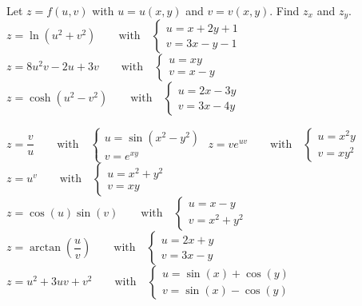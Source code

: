 \begin{Exercise} Let $z=f(u,v)$ with $u=u(x,y)$ and $v=v(x,y)$. Find $z_x$ and $z_y$.  %
	\Question[difficulty=1] $z = \ln \left(u^2+v^2\right)\qquad \mbox{with} \quad \left\{\begin{array}{l} u = x+2y+1\\ v = 3x-y-1\end{array}\right.$ 
	\ifcalculus
	\Question[difficulty=1] $z = 8u^2v-2u+3v \qquad \mbox{with} \quad \left\{\begin{array}{l} u = xy\\ v = x-y\end{array}\right.$ 
	\fi
    \ifanalysis
    \Question[difficulty=2] $z = \cosh \left(u^2-v^2\right)\qquad \mbox{with} \quad \left\{\begin{array}{l}u=2x-3y\\ v=3x-4y\end{array}\right.$ 
    \fi

	\Question[difficulty=2] $z = \dfrac{v}{u}\qquad \mbox{with} \quad \left\{\begin{array}{l} u=\sin \left(x^2-y^2\right)\\v=e^{xy}\end{array}\right.$
	\Question[difficulty=3] $z = ve^{uv}\qquad \mbox{with} \quad \left\{\begin{array}{l} u=x^2y\\v=xy^2\end{array}\right.$
	\Question[difficulty=3] $z = u^v\qquad \mbox{with} \quad \left\{\begin{array}{l} u=x^2+y^2\\v=xy\end{array}\right.$
	\ifcalculus
	\Question[difficulty=1] $z = \cos(u)\sin(v)\qquad \mbox{with} \quad \left\{\begin{array}{l} u=x-y\\v=x^2+y^2\end{array}\right.$
	\Question[difficulty=2] $z = \arctan\left(\dfrac{u}{v}\right)\qquad \mbox{with} \quad \left\{\begin{array}{l} u=2x+y\\v=3x-y\end{array}\right.$
	\Question[difficulty=1] $z = u^2+3uv+v^2\qquad \mbox{with} \quad \left\{\begin{array}{l} u=\sin(x)+\cos(y)\\v=\sin(x)-\cos(y)\end{array}\right.$
	\fi
\end{Exercise}

